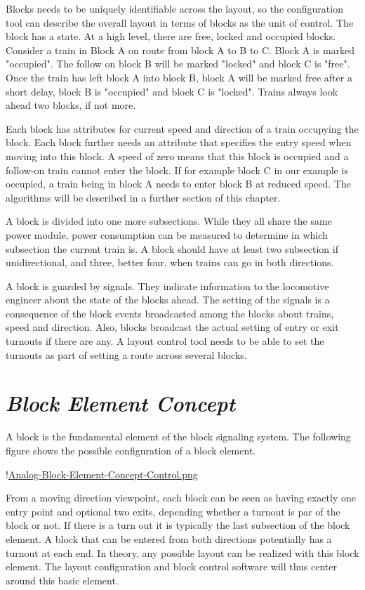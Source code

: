 Blocks needs to be uniquely identifiable across the layout, so the configuration tool can describe the overall layout in terms of blocks as the unit of control. The block has a state. At a high level, there are free, locked and occupied blocks. Consider a train in Block A on route from block A to B to C. Block A is marked "occupied". The follow on block B will be marked "locked" and block C is "free". Once the train has left block A into block B, block A will be marked free after a short delay, block B is "occupied" and block C is "locked". Trains always look ahead two blocks, if not more.

Each block has attributes for current speed and direction of a train occupying the block. Each block further needs an attribute that specifies the entry speed when moving into this block. A speed of zero means that this block is occupied and a follow-on train cannot enter the block. If for example block C in our example is occupied, a train being in block A needs to enter block B at reduced speed. The algorithms will be described in a further section of this chapter.

A block is divided into one more subsections. While they all share the same power module, power consumption can be measured to determine in which subsection the current train is. A block should have at least two subsection if unidirectional, and three, better four, when trains can go in both directions.

A block is guarded by signals. They indicate information to the locomotive engineer about the state of the blocks ahead. The setting of the signals is a consequence of the block events broadcasted among the blocks about trains, speed and direction. Also, blocks broadcast the actual setting of entry or exit turnouts if there are any. A layout control tool needs to be able to set the turnouts as part of setting a route across several blocks.

\section{\textit{Block Element Concept}}

A block is the fundamental element of the block signaling system. The following figure shows the possible configuration of a block  element.

!\href{./Figures/Block-Element-Concept.png }{Analog-Block-Element-Concept-Control.png}

From a moving direction viewpoint, each block can be seen as having exactly one entry point and optional two exits, depending whether a turnout is par of the block or not. If there is a turn out it is typically the last subsection of the block element. A block that can be entered from both directions potentially has a turnout at each end. In theory, any possible layout can be realized with this block element. The layout configuration and block control software will thus center around this basic element.


